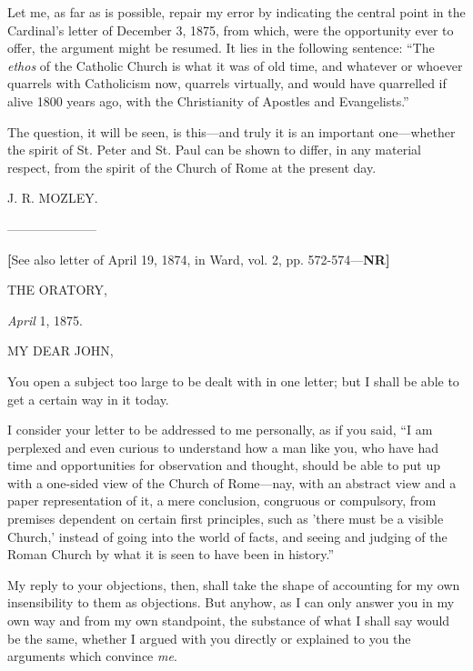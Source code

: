 Let me, as far as is possible, repair my error by
indicating the central point in the Cardinal's letter of December 3,
1875, from which, were the opportunity ever to offer, the
argument might be resumed. It lies in the following sentence: ``The \emph{ethos}
of the Catholic Church is what it was of old time, and whatever or
whoever quarrels with Catholicism now, quarrels virtually, and would
have quarrelled if alive 1800 years ago, with the Christianity of
Apostles and Evangelists.''

The question, it will be seen, is this—and
truly it is an important one—whether the spirit of St. Peter and St.
Paul can be shown to differ, in any material respect, from the spirit
of the Church of Rome at the present day.

J. R. MOZLEY.

———————

\textbf{[}See also letter
of April 19, 1874, in Ward, vol. 2, pp. 572-574—\textbf{NR}\textbf{]}

THE ORATORY,

\emph{April} 1, 1875.

MY DEAR
JOHN,

You open a subject too large to be dealt with in one letter; but I
shall be able to get a certain way in it today.

I consider your letter to be addressed to me
personally, as if you said, ``I am perplexed and even curious to
understand how a man like you, who have had time and opportunities for
observation and thought, should be able to put up with a one-sided
view of the Church of Rome—nay, with an abstract view and a paper
representation of it, a mere conclusion, congruous or compulsory, from
premises dependent on certain first principles, such as 'there must be
a visible Church,' instead of going into the world of facts, and
seeing and judging of the Roman Church by what it is seen to have been
in history.''

My reply to your objections, then, shall take the
shape of accounting for my own insensibility to them as objections.
But anyhow, as I can only answer you in my own way and from my own
standpoint, the substance of what I shall say would be the same,
whether I argued with you directly or explained to you the arguments
which convince \emph{me}.

